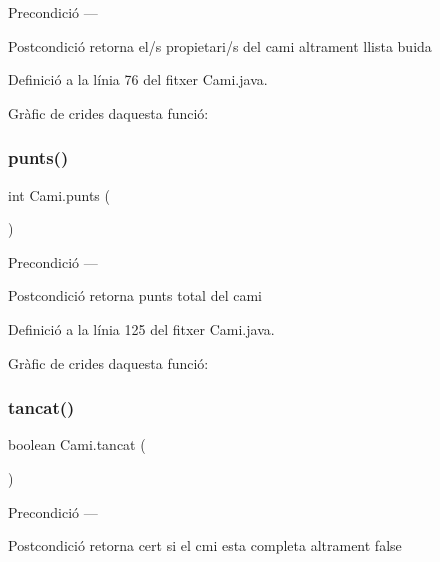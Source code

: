 \begin{DoxyPrecond}{Precondició}
--- 
\end{DoxyPrecond}
\begin{DoxyPostcond}{Postcondició}
retorna el/s propietari/s del cami altrament llista buida 
\end{DoxyPostcond}


Definició a la línia 76 del fitxer Cami.\+java.

Gràfic de crides d\textquotesingle{}aquesta funció\+:
\mbox{\label{class_cami_a8d0a4b74b03239864c2d55217c99ed20}} 
\subsubsection{\texorpdfstring{punts()}{punts()}}
{\footnotesize\ttfamily int Cami.\+punts (\begin{DoxyParamCaption}{ }\end{DoxyParamCaption})}

\begin{DoxyPrecond}{Precondició}
--- 
\end{DoxyPrecond}
\begin{DoxyPostcond}{Postcondició}
retorna punts total del cami 
\end{DoxyPostcond}


Definició a la línia 125 del fitxer Cami.\+java.

Gràfic de crides d\textquotesingle{}aquesta funció\+:
\mbox{\label{class_cami_a52921b82d752559596aab860d75e6077}} 
\subsubsection{\texorpdfstring{tancat()}{tancat()}}
{\footnotesize\ttfamily boolean Cami.\+tancat (\begin{DoxyParamCaption}{ }\end{DoxyParamCaption})}

\begin{DoxyPrecond}{Precondició}
--- 
\end{DoxyPrecond}
\begin{DoxyPostcond}{Postcondició}
retorna cert si el cmi esta completa altrament false 
\end{DoxyPostcond}


